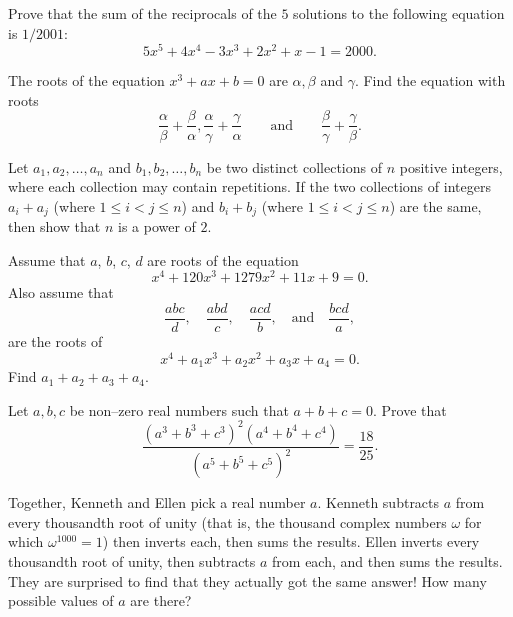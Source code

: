 \documentclass[12pt,a4paper]{memoir}
\theoremstyle{definition}
\begin{document}
\begin{question}
	Prove that the sum of the reciprocals of the $5$ solutions to the following equation is $1/2001$: 
	\[5x^5+4x^4-3x^3+2x^2+x-1=2000.\]
\end{question}

\begin{question}
	The roots of the equation $x^{3} +ax +b=0$ are $\alpha, \beta$ and $\gamma$. Find the equation with roots \[\frac{\alpha}{\beta} + \frac{\beta}{\alpha}, \frac{\alpha}{\gamma} + \frac{\gamma}{\alpha} \qquad \text{and} \qquad \frac{\beta}{\gamma} + \frac{\gamma}{\beta}.\]
\end{question}

\begin{question}
	Let $a_1, a_2, \dots, a_n$ and $b_1, b_2, \dots, b_n$ be two distinct collections of $n$ positive integers, where each collection may contain repetitions. If the two collections of integers $a_i + a_j $ (where $1 \leq i<j \leq n$) and $b_i + b_j $ (where $1 \leq i<j \leq n$) are the same, then show that $n$ is a power of $2$.
\end{question}


\begin{question}
	Assume that $a$, $b$, $c$, $d$ are roots of the equation \[x^4 + 120x^3 + 1279x^2 + 11x + 9 = 0.\] Also assume that \[\frac{abc}{d}, \quad \frac{abd}{c}, \quad \frac{acd}{b}, \quad \text{and} \quad \frac{bcd}{a},\] are the roots of \[x^4 + a_1x^3 + a_2x^2 + a_3x + a_4 = 0.\] Find $a_1 + a_2 + a_3 + a_4$.
\end{question}


\begin{question}
	Let $a,b,c$ be non--zero real numbers such that $a+b+c=0$. Prove that
	\[\frac{\left( a^{3}+b^{3}+c^{3} \right)^{2}\left( a^{4}+b^{4}+c^{4} \right)}{\left( a^{5}+b^{5}+c^{5} \right)^{2}}=\frac{18}{25}.\]
\end{question}

\begin{question}[name={2017 PUMaC}]
	Together, Kenneth and Ellen pick a real number $a$. Kenneth subtracts $a$ from every thousandth root of unity (that is, the thousand complex numbers $\omega$ for which $\omega^{1000}=1$) then inverts each, then sums the results. Ellen inverts every thousandth root of unity, then subtracts $a$ from each, and then sums the results. They are surprised to find that they actually got the same answer! How many possible values of $a$ are there?
\end{question}
\end{document}
